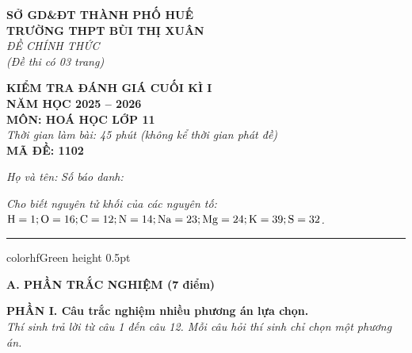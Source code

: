 \documentclass[11pt,a4paper]{article}
\begin{document}
\begin{minipage}[t]{0.48\textwidth}
\textbf{SỞ GD\&ĐT THÀNH PHỐ HUẾ}\\
\textbf{TRƯỜNG THPT BÙI THỊ XUÂN}\\
\textit{ĐỀ CHÍNH THỨC}\\
\textit{(Đề thi có 03 trang)}
\end{minipage}
\hfill
\begin{minipage}[t]{0.48\textwidth}
\raggedleft
\textbf{\color{hfRed}KIỂM TRA ĐÁNH GIÁ CUỐI KÌ I}\\
\textbf{NĂM HỌC 2025 -- 2026}\\
\textbf{MÔN: HOÁ HỌC LỚP 11}\\
\textit{Thời gian làm bài: 45 phút (không kể thời gian phát đề)}\\
\textbf{MÃ ĐỀ: 1102}
\end{minipage}

\vspace{4pt}
\noindent
\textit{Họ và tên:} \dotfill \textit{Số báo danh:} \dotfill

\vspace{3pt}
\noindent
\textit{\footnotesize Cho biết nguyên tử khối của các nguyên tố: $\ce{H} = 1; \ce{O} = 16; \ce{C} = 12; \ce{N} = 14; \ce{Na} = 23; \ce{Mg} = 24; \ce{K} = 39; \ce{S} = 32$.}

\vspace{3pt}
\hrule color{hfGreen} height 0.5pt

\vspace{4pt}
\noindent
{\color{mainGreen}\textbf{\Large A. PHẦN TRẮC NGHIỆM (7 điểm)}}

\vspace{3pt}
\noindent
{\color{mainGreen}\textbf{\large PHẦN I. Câu trắc nghiệm nhiều phương án lựa chọn.}}\\
\textit{\small Thí sinh trả lời từ câu 1 đến câu 12. Mỗi câu hỏi thí sinh chỉ chọn một phương án.}
\vspace{2pt}
\end{document}

